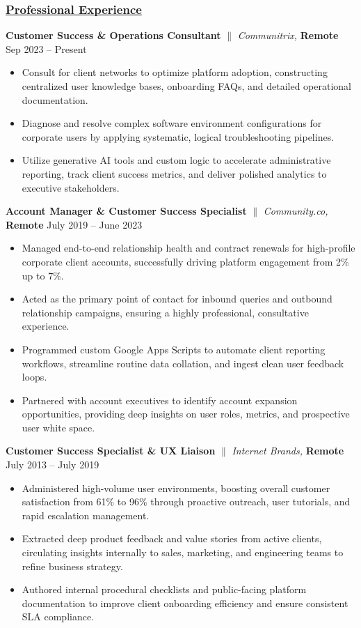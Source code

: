 \documentclass[a4paper,10pt]{article}
\begin{document}
\subsubsection{\underline{Professional Experience}}
{\textbf{Customer Success \& Operations Consultant} $\parallel$ \textit{Communitrix,}  \textbf{Remote} \hfill {Sep 2023 – Present}}
\begin{itemize}
      \item Consult for client networks to optimize platform adoption, constructing centralized user knowledge bases, onboarding FAQs, and detailed operational documentation.
      \item Diagnose and resolve complex software environment configurations for corporate users by applying systematic, logical troubleshooting pipelines.
      \item Utilize generative AI tools and custom logic to accelerate administrative reporting, track client success metrics, and deliver polished analytics to executive stakeholders.
\end{itemize}
\vspace{1.5mm}
{\textbf{Account Manager \& Customer Success Specialist} $\parallel$ \textit{Community.co,}  \textbf{Remote} \hfill {July 2019 – June 2023}}
\begin{itemize}
      \item Managed end-to-end relationship health and contract renewals for high-profile corporate client accounts, successfully driving platform engagement from 2\% up to 7\%.
      \item Acted as the primary point of contact for inbound queries and outbound relationship campaigns, ensuring a highly professional, consultative experience.
      \item Programmed custom Google Apps Scripts to automate client reporting workflows, streamline routine data collation, and ingest clean user feedback loops.
      \item Partnered with account executives to identify account expansion opportunities, providing deep insights on user roles, metrics, and prospective user white space.
\end{itemize}
\vspace{1.5mm}
{\textbf{Customer Success Specialist \& UX Liaison} $\parallel$ \textit{Internet Brands,}  \textbf{Remote} \hfill {July 2013 – July 2019}}
\begin{itemize}
      \item Administered high-volume user environments, boosting overall customer satisfaction from 61\% to 96\% through proactive outreach, user tutorials, and rapid escalation management.
      \item Extracted deep product feedback and value stories from active clients, circulating insights internally to sales, marketing, and engineering teams to refine business strategy.
      \item Authored internal procedural checklists and public-facing platform documentation to improve client onboarding efficiency and ensure consistent SLA compliance.
\end{itemize}
\end{document}
